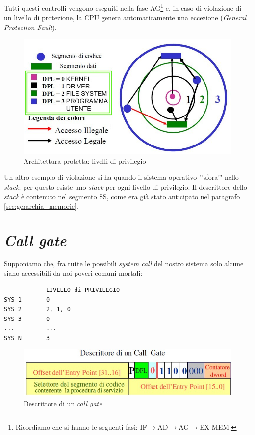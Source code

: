 Tutti questi controlli vengono eseguiti nella fase AG\footnote{Ricordiamo che si hanno le seguenti fasi: IF$\to$AD$\to$AG$\to$EX-MEM.} e, in caso di violazione di un livello di protezione, la CPU genera automaticamente una eccezione (\textit{General Protection Fault}).

\begin{figure}[!h]
\centering
\includegraphics[width=0.65\columnwidth]{img/livelliprivilegio}
\caption{Architettura protetta: livelli di privilegio}
\label{fig:livelliprivilegio}
\end{figure}

Un altro esempio di violazione si ha quando il sistema operativo "'sfora'" nello \textit{stack}: per questo esiste uno \textit{stack} per ogni livello di privilegio. Il descrittore dello \textit{stack} è contenuto nel segmento SS, come era già stato anticipato nel paragrafo \ref{sec:gerarchia_memorie}.

\section{\textit{Call gate}}
\label{sec:colgateDentifricio}

Supponiamo che, fra tutte le possibili \textit{system call} del nostro sistema solo alcune siano accessibili da noi poveri comuni mortali:
\begin{verbatim}
            LIVELLO di PRIVILEGIO
SYS 1       0
SYS 2       2, 1, 0
SYS 3       0
...         ...
SYS N       3
\end{verbatim}

\begin{figure}[!h]
\centering
\includegraphics[width=0.65\columnwidth]{img/Callgate}
\caption{Descrittore di un \textit{call gate}}
\label{fig:Callgate}
\end{figure}

